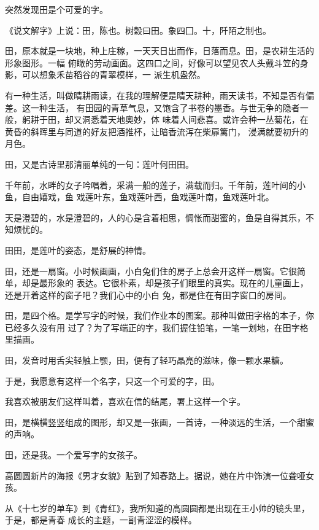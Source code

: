 		突然发现田是个可爱的字。

		《说文解字》上说：田，陈也。树榖曰田。象四囗。十，阡陌之制也。

		田，原本就是一块地，种上庄稼，一天天日出而作，日落而息。田，是农耕生活的形象图形。一幅
	俯瞰的劳动画面。这四口之间，好像可以望见农人头戴斗笠的身影，可以想象禾苗稻谷的青翠模样，一
	派生机盎然。

		有一种生活，叫做晴耕雨读，在我的理解便是晴天耕种，雨天读书，不知是否有偏差。这一种生活，
	有田园的青草气息，又饱含了书卷的墨香。与世无争的隐者一般，躬耕于田，却又洞悉着天地奥妙，体
	味着人间悲喜。或许会种一丛菊花，在黄昏的斜晖里与同道的好友把酒推杯，让暗香流泻在柴扉篱门，
	浸满就要初升的月色。


		田，又是古诗里那清丽单纯的一句：莲叶何田田。

		千年前，水畔的女子吟唱着，采满一船的莲子，满载而归。千年前，莲叶间的小鱼，自由嬉戏，鱼
	戏莲叶东，鱼戏莲叶西，鱼戏莲叶南，鱼戏莲叶北。

		天是澄碧的，水是澄碧的，人的心是含着相思，惆怅而甜蜜的，鱼是自得其乐，不知烦忧的。

		田田，是莲叶的姿态，是舒展的神情。

		田，还是一扇窗。小时候画画，小白兔们住的房子上总会开这样一扇窗。它很简单，却是最形象的
	表达。它很朴素，却是孩子们眼里的真实。现在的儿童画上，还是开着这样的窗子吧？我们心中的小白
	兔，都是住在有田字窗口的房间。

		田，是四个格。是学写字的时候，我们作业本的图案。那种叫做田字格的本子，你已经多久没有用
	过了？为了写端正的字，我们握住铅笔，一笔一划地，在田字格里描画。

		田，发音时用舌尖轻触上颚，田，便有了轻巧晶亮的滋味，像一颗水果糖。

		于是，我愿意有这样一个名字，只这一个可爱的字，田。

		我喜欢被朋友们这样叫着，喜欢在信的结尾，署上这样一个字。

		田，是横横竖竖组成的图形，却又是一张画，一首诗，一种淡远的生活，一个甜蜜的声响。

		田，还是我。一个爱写字的女孩子。

	\endwriting



		高圆圆新片的海报《男才女貌》贴到了知春路上。据说，她在片中饰演一位聋哑女孩。

		从《十七岁的单车》到《青红》，我所知道的高圆圆都是出现在王小帅的镜头里，于是，都是青春
	成长的主题，一副青涩涩的模样。


